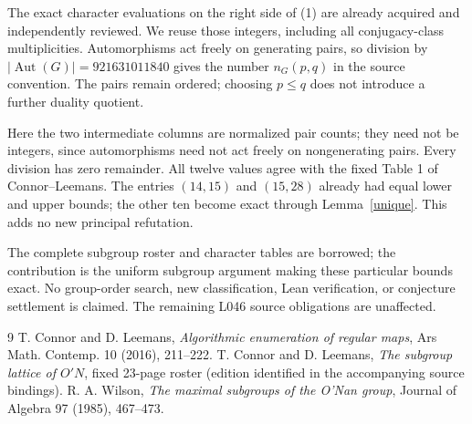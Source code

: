 \documentclass[11pt,a4paper]{article}
\begin{document}
The exact character evaluations on the right side of (1) are already
acquired and independently reviewed. We reuse those integers, including
all conjugacy-class multiplicities. Automorphisms act freely on generating
pairs, so division by $|\operatorname{Aut}(G)|=921631011840$ gives
the number $n_G(p,q)$ in the source convention. The pairs remain
ordered; choosing $p\leq q$ does not introduce a further duality quotient.

Here the two intermediate columns are normalized pair counts; they
need not be integers, since automorphisms need not act freely on
nongenerating pairs.
Every division has zero remainder. All twelve values agree with the
fixed Table 1 of Connor--Leemans. The entries $(14,15)$ and $(15,28)$
already had equal lower and upper bounds; the other ten become exact
through Lemma~\ref{unique}. This adds no new principal refutation.

The complete subgroup roster and character tables are borrowed;
the contribution is the uniform subgroup argument making these
particular bounds exact. No group-order search, new classification,
Lean verification, or conjecture settlement is claimed. The remaining
L046 source obligations are unaffected.
\begin{thebibliography}{9}
 T. Connor and D. Leemans, \emph{Algorithmic enumeration
of regular maps}, Ars Math. Contemp. 10 (2016), 211--222.
 T. Connor and D. Leemans, \emph{The subgroup lattice
of $O'N$}, fixed 23-page roster (edition identified in the accompanying
source bindings).
 R. A. Wilson, \emph{The maximal subgroups of the
O'Nan group}, Journal of Algebra 97 (1985), 467--473.
\end{thebibliography}
\end{document}
